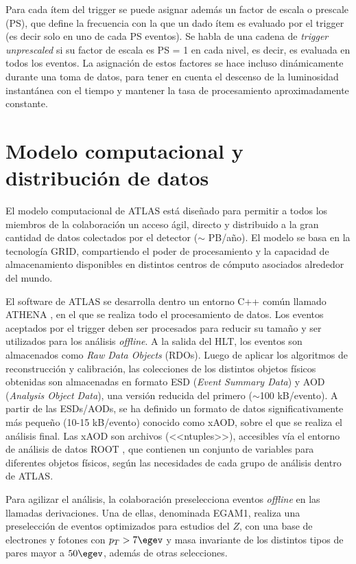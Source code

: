 Para cada ítem del trigger se puede asignar además un factor de escala o prescale (PS), que define la frecuencia con la que un dado ítem es evaluado por el trigger (es decir solo en uno de cada PS eventos). Se habla de una cadena de \textit{trigger unprescaled} si su factor de escala es PS = 1 en cada nivel, es decir, es evaluada en todos los eventos. La asignación de estos factores se hace incluso dinámicamente durante una toma de datos, para tener en cuenta el descenso de la luminosidad instantánea con el tiempo y mantener la tasa de procesamiento aproximadamente constante.

\section{Modelo computacional y distribución de datos}

El modelo computacional de ATLAS está diseñado para permitir a todos los miembros de la colaboración un acceso ágil, directo y distribuido a la gran cantidad de datos colectados por el detector ($\sim$ PB/año). El modelo se basa en la tecnología GRID, compartiendo el poder de procesamiento y la capacidad de almacenamiento disponibles en distintos centros de cómputo asociados alrededor del mundo.

El software de ATLAS se desarrolla dentro un entorno C++ común llamado ATHENA \cite{ATLASComputing, Lenzi:1214931, Calafiura:865624}, en el que se realiza todo el procesamiento de datos. Los eventos aceptados por el trigger deben ser procesados para reducir su tamaño y ser utilizados para los análisis \textit{offline}. A la salida del HLT, los eventos son almacenados como \textit{Raw Data Objects} (RDOs). Luego de aplicar los algoritmos de reconstrucción y calibración, las colecciones de los distintos objetos físicos obtenidas son almacenadas en formato ESD (\textit{Event Summary Data}) y AOD (\textit{Analysis Object Data}), una versión reducida del primero ($\sim$100 kB/evento). A partir de las ESDs/AODs, se ha definido un formato de datos significativamente más pequeño (10-15 kB/evento) conocido como xAOD, sobre el que se realiza el análisis final. Las xAOD son archivos (<<ntuples>>), accesibles vía el entorno de análisis de datos ROOT \cite{Brun:1997pa}, que contienen un conjunto de variables para diferentes objetos físicos, según las necesidades de cada grupo de análisis dentro de ATLAS. 

Para agilizar el análisis, la colaboración preselecciona eventos \textit{offline} en las llamadas derivaciones. Una de ellas, denominada EGAM1, realiza una preselección de eventos optimizados para estudios del $Z$, con una base de electrones y fotones con $p_{T} > 7 \egev$ y masa invariante de los distintos tipos de pares mayor a $50 \egev$, además de otras selecciones.